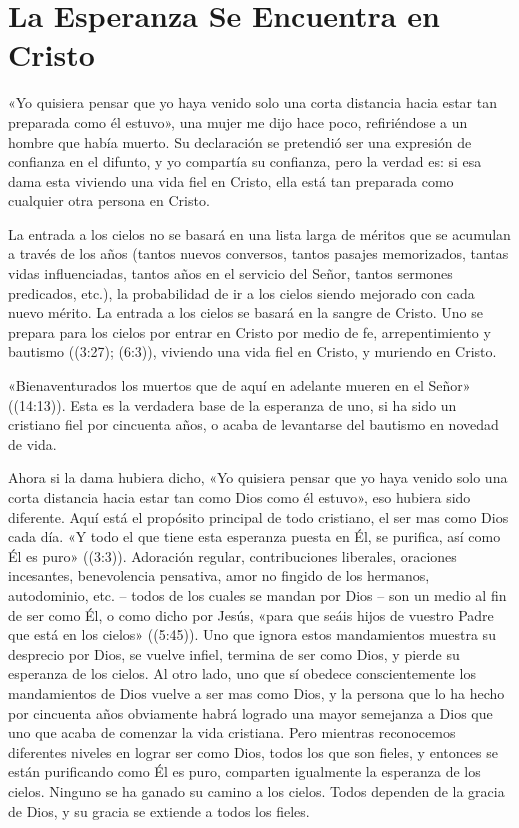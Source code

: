 \documentclass[12pt, twoside, openright]{book}
\begin{document}
\section{La Esperanza Se Encuentra en Cristo}
«Yo quisiera pensar que yo haya venido solo una corta distancia hacia estar tan preparada como él estuvo», una mujer me dijo hace poco, refiriéndose a un hombre que había muerto. Su declaración se pretendió ser una expresión de confianza en el difunto, y yo compartía su confianza, pero la verdad es: si esa dama esta viviendo una vida fiel en Cristo, ella está tan preparada como cualquier otra persona en Cristo.

La entrada a los cielos no se basará en una lista larga de méritos que se acumulan a través de los años (tantos nuevos conversos, tantos pasajes memorizados, tantas vidas influenciadas, tantos años en el servicio del Señor, tantos sermones predicados, etc.), la probabilidad de ir a los cielos siendo mejorado con cada nuevo mérito. La entrada a los cielos se basará en la sangre de Cristo. Uno se prepara para los cielos por entrar en Cristo por medio de fe, arrepentimiento y bautismo ((3:27); (6:3)), viviendo una vida fiel en Cristo, y muriendo en Cristo. 

«Bienaventurados los muertos que de aquí en adelante mueren en el Señor» ((14:13)). Esta es la verdadera base de la esperanza de uno, si ha sido un cristiano fiel por cincuenta años, o acaba de levantarse del bautismo en novedad de vida. 

Ahora si la dama hubiera dicho, «Yo quisiera pensar que yo haya venido solo una corta distancia hacia estar tan como Dios como él estuvo», eso hubiera sido diferente. Aquí está el propósito principal de todo cristiano, el ser mas como Dios cada día. «Y todo el que tiene esta esperanza puesta en Él, se purifica, así como Él es puro» ((3:3)). Adoración regular, contribuciones liberales, oraciones incesantes, benevolencia pensativa, amor no fingido de los hermanos, autodominio, etc. – todos de los cuales se mandan por Dios – son un medio al fin de ser como Él, o como dicho por Jesús, «para que seáis hijos de vuestro Padre que está en los cielos» ((5:45)). Uno que ignora estos mandamientos muestra su desprecio por Dios, se vuelve infiel, termina de ser como Dios, y pierde su esperanza de los cielos. Al otro lado, uno que sí obedece conscientemente los mandamientos de Dios vuelve a ser mas como Dios, y la persona que lo ha hecho por cincuenta años obviamente habrá logrado una mayor semejanza a Dios que uno que acaba de comenzar la vida cristiana. Pero mientras reconocemos diferentes niveles en lograr ser como Dios, todos los que son fieles, y entonces se están purificando como Él es puro, comparten igualmente la esperanza de los cielos. Ninguno se ha ganado su camino a los cielos. Todos dependen de la gracia de Dios, y su gracia se extiende a todos los fieles.
\end{document}
